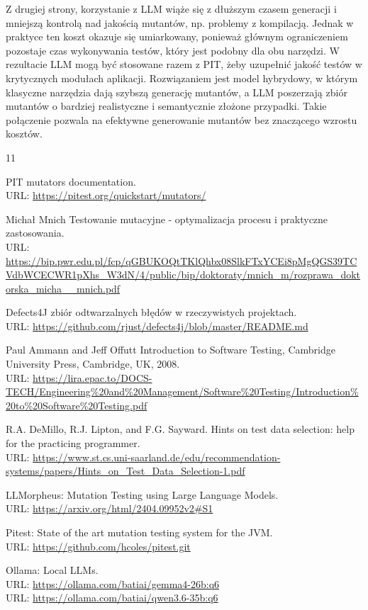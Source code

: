 \documentclass[12pt,a4paper,oldfontcommands]{memoir}
\theoremstyle{plain}
\theoremstyle{definition}
\theoremstyle{remark}
\begin{document}
    Z drugiej strony, korzystanie z LLM wiąże się z dłuższym czasem generacji i mniejszą kontrolą nad jakością mutantów, np. problemy z kompilacją.
    Jednak w praktyce ten koszt okazuje się umiarkowany, ponieważ głównym ograniczeniem pozostaje czas wykonywania testów, który jest podobny dla obu narzędzi.
    W rezultacie LLM mogą być stosowane razem z PIT, żeby uzupełnić jakość testów w krytycznych modułach aplikacji.
    Rozwiązaniem jest model hybrydowy, w którym klasyczne narzędzia dają szybszą generację mutantów, a LLM poszerzają zbiór mutantów o bardziej realistyczne i semantycznie złożone przypadki.
    Takie połączenie pozwala na efektywne generowanie mutantów bez znaczącego wzrostu kosztów.

    \begin{thebibliography}{11}

        PIT mutators documentation. \\
        URL: \url{https://pitest.org/quickstart/mutators/}

        Michał Mnich Testowanie mutacyjne - optymalizacja procesu i praktyczne zastosowania. \\
        URL: \url{https://bip.pwr.edu.pl/fcp/qGBUKOQtTKlQhbx08SlkFTxYCEi8pMgQGS39TCVdbWCECWR1pXhs_W3dN/4/public/bip/doktoraty/mnich_m/rozprawa_doktorska_micha__mnich.pdf}

        Defects4J zbiór odtwarzalnych błędów w rzeczywistych projektach. \\
        URL: \url{https://github.com/rjust/defects4j/blob/master/README.md}

        Paul Ammann and Jeff Offutt Introduction to Software Testing, Cambridge University Press, Cambridge, UK, 2008. \\
        URL: \url{https://lira.epac.to/DOCS-TECH/Engineering%20and%20Management/Software%20Testing/Introduction%20to%20Software%20Testing.pdf}

        R.A. DeMillo, R.J. Lipton, and F.G. Sayward. Hints on test data selection: help for the practicing programmer. \\
        URL: \url{https://www.st.cs.uni-saarland.de/edu/recommendation-systems/papers/Hints_on_Test_Data_Selection-1.pdf}

        LLMorpheus: Mutation Testing using Large Language Models. \\
        URL: \url{https://arxiv.org/html/2404.09952v2#S1}

        Pitest: State of the art mutation testing system for the JVM. \\
        URL: \url{https://github.com/hcoles/pitest.git}

        Ollama: Local LLMs. \\
        URL: \url{https://ollama.com/batiai/gemma4-26b:q6} \\
        URL: \url{https://ollama.com/batiai/qwen3.6-35b:q6}

    \end{thebibliography}
\end{document}
